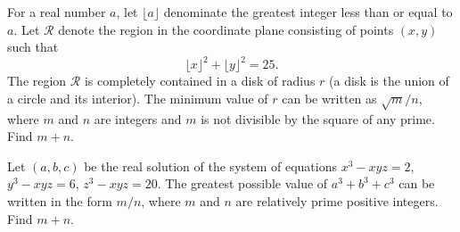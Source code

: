 %	












\begin{question}[name={2010 AIME I, \href{https://artofproblemsolving.com/community/c4p1813807}{Problem 8}}]
	For a real number $ a$, let $ \lfloor a \rfloor$ denominate the greatest integer less than or equal to $ a$. Let $ \mathcal{R}$ denote the region in the coordinate plane consisting of points $ (x,y)$ such that\[\lfloor x \rfloor ^2 + \lfloor y \rfloor ^2 = 25.\]The region $ \mathcal{R}$ is completely contained in a disk of radius $ r$ (a disk is the union of a circle and its interior). The minimum value of $ r$ can be written as $  {\sqrt {m}}/{n}$, where $ m$ and $ n$ are integers and $ m$ is not divisible by the square of any prime. Find $m + n$.
\end{question}


%	


























\begin{question}[name={2010 AIME I, \href{https://artofproblemsolving.com/community/c4p1813805}{Problem 9}}]
	Let $ (a,b,c)$ be the real solution of the system of equations $ x^3 - xyz = 2$, $ y^3 - xyz = 6$, $ z^3 - xyz = 20$. The greatest possible value of $ a^3 + b^3 + c^3$ can be written in the form ${m}/{n}$, where $ m$ and $ n$ are relatively prime positive integers. Find $ m + n$.
\end{question}


%	














